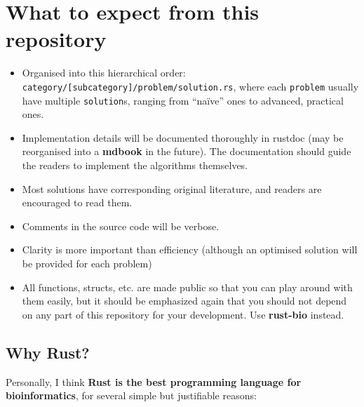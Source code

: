 \documentclass[
]{book}
\providecommand{\tightlist}{%
  \setlength{\itemsep}{0pt}\setlength{\parskip}{0pt}}
\begin{document}
\hypertarget{what-to-expect-from-this-repository}{%
\chapter{What to expect from this repository}\label{what-to-expect-from-this-repository}}

\begin{itemize}
\tightlist
\item
  Organised into this hierarchical order: \texttt{category/{[}subcategory{]}/problem/solution.rs}, where each \texttt{problem} usually have multiple \texttt{solution}s, ranging from ``naïve'' ones to advanced, practical ones.
\item
  Implementation details will be documented thoroughly in rustdoc (may be reorganised into a \textbf{mdbook} in the future). The documentation should guide the readers to implement the algorithms themselves.
\item
  Most solutions have corresponding original literature, and readers are encouraged to read them.
\item
  Comments in the source code will be verbose.
\item
  Clarity is more important than efficiency (although an optimised solution will be provided for each problem)
\item
  All functions, structs, etc. are made public so that you can play around with them easily, but it should be emphasized again that you should not depend on any part of this repository for your development. Use \textbf{rust-bio} instead.
\end{itemize}

\hypertarget{why-rust}{%
\section{Why Rust?}\label{why-rust}}

Personally, I think \textbf{Rust is the best programming language for bioinformatics}, for several simple but justifiable reasons:
\end{document}
